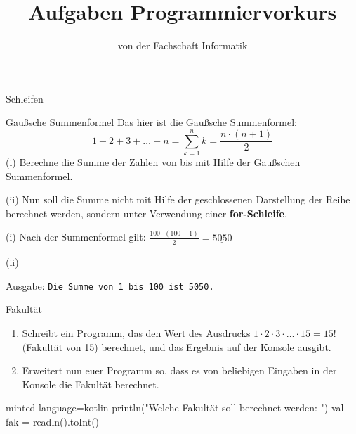 
\title{Aufgaben Programmiervorkurs}
\subtitle{von der Fachschaft Informatik\hfill\ptitle}

\maketitle{}

\begin{task}[points=auto]{Schleifen}
    \begin{subtask*}[points=0]{Gaußsche Summenformel }
        Das hier ist die Gaußsche Summenformel:
        $$1+2+3+\ldots+n = \sum_{k=1}^nk=\frac{n\cdot(n+1)}{2}$$
        (i) Berechne die Summe der Zahlen von  bis  mit Hilfe der Gaußschen Summenformel.

        (ii) Nun soll die Summe nicht mit Hilfe der geschlossenen Darstellung der Reihe berechnet werden, sondern unter Verwendung einer \textbf{for-Schleife}.

        \begin{solution}
            (i) Nach der Summenformel gilt: $\frac{100\cdot(100+1)}{2} = \underline{\underline{5050}}$

            (ii) 
            Ausgabe: \texttt{Die Summe von 1 bis 100 ist 5050.}
        \end{solution}
    \end{subtask*}
    \begin{subtask*}[points=0]{Fakultät }
        \begin{enumerate}
            \item Schreibt ein Programm, das den Wert des Ausdrucks $1   \cdot \ldots {} = 15!$ (Fakultät von 15) berechnet, und das Ergebnis auf der Konsole ausgibt.
            \item Erweitert nun euer Programm so, dass es von beliebigen Eingaben in der Konsole die Fakultät berechnet.
        \end{enumerate}

        \begin{solution}
            \begin{codeBlock}[]{minted language=kotlin}
            println("Welche Fakultät soll berechnet werden: ")
            val fak = readln().toInt()


\end{codeBlock}
\end{solution}
\end{subtask*}
\end{task}
